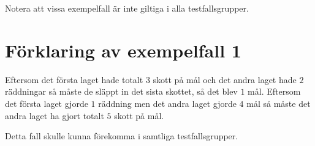 Notera att vissa exempelfall är inte giltiga i alla testfallsgrupper.

\section*{Förklaring av exempelfall 1}
Eftersom det första laget hade totalt $3$ skott på mål och det andra laget hade $2$ räddningar så måste de släppt in det sista skottet, så det blev $1$ mål.
Eftersom det första laget gjorde $1$ räddning men det andra laget gjorde $4$ mål så måste det andra laget ha gjort totalt $5$ skott på mål.

Detta fall skulle kunna förekomma i samtliga testfallsgrupper.
